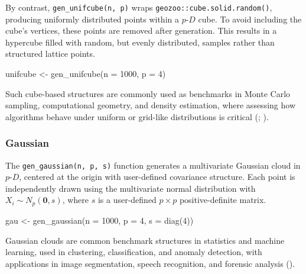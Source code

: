 \documentclass[
  11pt,
  a4paper,
]{report}
\newenvironment{Shaded}{\begin{snugshade}}{\end{snugshade}}
\newcommand{\AttributeTok}[1]{\textcolor[rgb]{0.40,0.45,0.13}{#1}}
\newcommand{\DecValTok}[1]{\textcolor[rgb]{0.68,0.00,0.00}{#1}}
\newcommand{\FunctionTok}[1]{\textcolor[rgb]{0.28,0.35,0.67}{#1}}
\newcommand{\NormalTok}[1]{\textcolor[rgb]{0.00,0.23,0.31}{#1}}
\newcommand{\OtherTok}[1]{\textcolor[rgb]{0.00,0.23,0.31}{#1}}
\begin{document}
By contrast, \texttt{gen\_unifcube(n,\ p)} wraps
\texttt{geozoo::cube.solid.random()}, producing uniformly distributed
points within a \(p\text{-}D\) cube. To avoid including the cube's
vertices, these points are removed after generation. This results in a
hypercube filled with random, but evenly distributed, samples rather
than structured lattice points.

\begin{Shaded}
\begin{Highlighting}[]
\NormalTok{unifcube }\OtherTok{\textless{}{-}} \FunctionTok{gen\_unifcube}\NormalTok{(}\AttributeTok{n =} \DecValTok{1000}\NormalTok{, }\AttributeTok{p =} \DecValTok{4}\NormalTok{)}
\end{Highlighting}
\end{Shaded}

Such cube-based structures are commonly used as benchmarks in Monte
Carlo sampling, computational geometry, and density estimation, where
assessing how algorithms behave under uniform or grid-like distributions
is critical (;
).

\subsubsection{Gaussian}\label{gaussian}

The \texttt{gen\_gaussian(n,\ p,\ s)} function generates a multivariate
Gaussian cloud in \(p\text{-}D\), centered at the origin with
user-defined covariance structure. Each point is independently drawn
using the multivariate normal distribution with
\(X_i \sim N_p(\boldsymbol{0}, s)\), where \(s\) is a user-defined
\(p \times p\) positive-definite matrix.

\begin{Shaded}
\begin{Highlighting}[]
\NormalTok{gau }\OtherTok{\textless{}{-}} \FunctionTok{gen\_gaussian}\NormalTok{(}\AttributeTok{n =} \DecValTok{1000}\NormalTok{, }\AttributeTok{p =} \DecValTok{4}\NormalTok{, }\AttributeTok{s =} \FunctionTok{diag}\NormalTok{(}\DecValTok{4}\NormalTok{))}
\end{Highlighting}
\end{Shaded}

Gaussian clouds are common benchmark structures in statistics and
machine learning, used in clustering, classification, and anomaly
detection, with applications in image segmentation, speech recognition,
and forensic analysis
().
\end{document}
